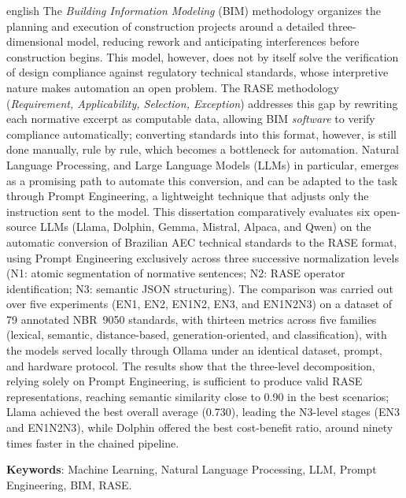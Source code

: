 \setlength{\absparsep}{18pt} %
\begin{resumo}[Abstract]
 \begin{otherlanguage*}{english}
    The \textit{Building Information Modeling} (BIM) methodology organizes the planning and execution of construction projects around a detailed three-dimensional model, reducing rework and anticipating interferences before construction begins. This model, however, does not by itself solve the verification of design compliance against regulatory technical standards, whose interpretive nature makes automation an open problem. The RASE methodology (\textit{Requirement, Applicability, Selection, Exception}) addresses this gap by rewriting each normative excerpt as computable data, allowing BIM \textit{software} to verify compliance automatically; converting standards into this format, however, is still done manually, rule by rule, which becomes a bottleneck for automation. Natural Language Processing, and Large Language Models (LLMs) in particular, emerges as a promising path to automate this conversion, and can be adapted to the task through Prompt Engineering, a lightweight technique that adjusts only the instruction sent to the model. This dissertation comparatively evaluates six open-source LLMs (Llama, Dolphin, Gemma, Mistral, Alpaca, and Qwen) on the automatic conversion of Brazilian AEC technical standards to the RASE format, using Prompt Engineering exclusively across three successive normalization levels (N1: atomic segmentation of normative sentences; N2: RASE operator identification; N3: semantic JSON structuring). The comparison was carried out over five experiments (EN1, EN2, EN1N2, EN3, and EN1N2N3) on a dataset of 79 annotated NBR~9050 standards, with thirteen metrics across five families (lexical, semantic, distance-based, generation-oriented, and classification), with the models served locally through Ollama under an identical dataset, prompt, and hardware protocol. The results show that the three-level decomposition, relying solely on Prompt Engineering, is sufficient to produce valid RASE representations, reaching semantic similarity close to 0.90 in the best scenarios; Llama achieved the best overall average (0.730), leading the N3-level stages (EN3 and EN1N2N3), while Dolphin offered the best cost-benefit ratio, around ninety times faster in the chained pipeline.
   \vspace{\onelineskip}

   \noindent
   \textbf{Keywords}: Machine Learning, Natural Language Processing, LLM, Prompt Engineering, BIM, RASE.
 \end{otherlanguage*}
\end{resumo}
